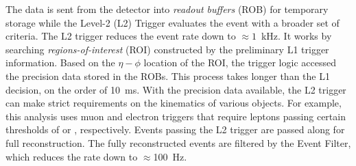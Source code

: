 The data is sent from the detector into \emph{readout buffers} (ROB) for temporary storage while the Level-2 (L2) Trigger evaluates the event with a broader set of criteria.
The L2 trigger reduces the event rate down to $\approx1$~kHz.
It works by searching \emph{regions-of-interest} (ROI) constructed by the preliminary L1 trigger information.
Based on the $\eta-\phi$ location of the ROI, the trigger logic accessed the precision data stored in the ROBs.
This process takes longer than the L1 decision, on the order of 10~ms.
With the precision data available, the L2 trigger can make strict requirements on the kinematics of various objects.
For example, this analysis uses muon and electron triggers that require leptons passing certain thresholds of \pt or \et, respectively.
Events passing the L2 trigger are passed along for full reconstruction.
The fully reconstructed events are filtered by the Event Filter, which reduces the rate down to  $\approx$100~Hz.
\cite{triggerTdr}
